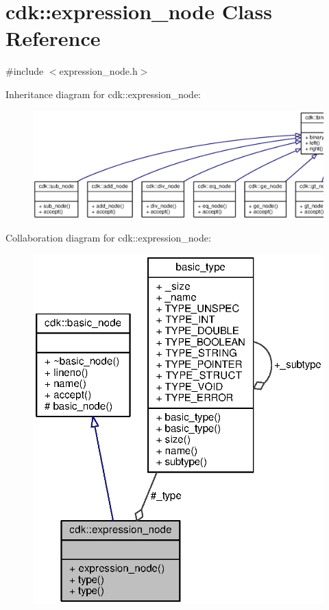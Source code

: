 \section{cdk\+:\+:expression\+\_\+node Class Reference}
\label{classcdk_1_1expression__node}


{\ttfamily \#include $<$expression\+\_\+node.\+h$>$}



Inheritance diagram for cdk\+:\+:expression\+\_\+node\+:
\nopagebreak
\begin{figure}[H]
\begin{center}
\leavevmode
\includegraphics[width=350pt]{classcdk_1_1expression__node__inherit__graph}
\end{center}
\end{figure}


Collaboration diagram for cdk\+:\+:expression\+\_\+node\+:
\nopagebreak
\begin{figure}[H]
\begin{center}
\leavevmode
\includegraphics[width=325pt]{classcdk_1_1expression__node__coll__graph}
\end{center}
\end{figure}

